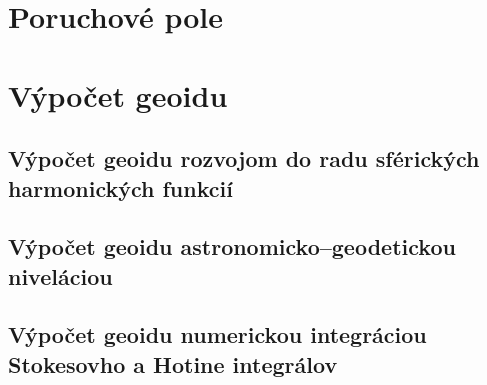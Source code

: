 \documentclass[a4paper, 12pt]{book}
\begin{document}

\chapter{Poruchové pole}
\label{sec:disturbing_field}








\chapter{Výpočet geoidu}
\label{sec:geoid_determination}







\section{Výpočet geoidu rozvojom do radu sférických harmonických funkcií}







\section{Výpočet geoidu astronomicko--geodetickou niveláciou}







\section{Výpočet geoidu numerickou integráciou Stokesovho a Hotine integrálov}






\end{document}
